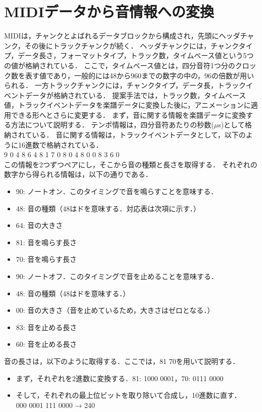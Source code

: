 \section{MIDIデータから音情報への変換} \label{sec:analysis}
MIDIは，チャンクとよばれるデータブロックから構成され，先頭にヘッダチャンク，その後にトラックチャンクが続く．
ヘッダチャンクには，チャンクタイプ，データ長さ，フォーマットタイプ，トラック数，タイムベース値という5つの値が格納されている．
ここで，タイムベース値とは，四分音符1つ分のクロック数を表す値であり，一般的には48から960までの数字の中の，96の倍数が用いられる．
一方トラックチャンクには，チャンクタイプ，データ長，トラックイベントデータが格納されている．
提案手法では，トラック数，タイムベース値，トラックイベントデータを楽譜データに変換した後に，アニメーションに適用できる形へとさらに変更する．
\indent
まず，音に関する情報を楽譜データに変換する方法について説明する．
テンポ情報は，四分音符あたりの秒数($\mu$s)として格納されている．
音に関する情報は，トラックイベントデータとして，以下のように16進数で格納されている．\\

\hspace{10mm}9 0 4 8 6 4 8 1 7 0 8 0 4 8 0 0 8 3 6 0\\

この情報を2つずつペアにし，そこから音の種類と長さを取得する．
それぞれの数字から得られる情報は，以下の通りである．
\begin{itemize}
	\item 90: ノートオン．このタイミングで音を鳴らすことを意味する．
	\item 48: 音の種類（48はドを意味する．対応表は次項に示す．）
	\item 64: 音の大きさ
	\item 81: 音を鳴らす長さ
	\item 70: 音を鳴らす長さ
	\item 90: ノートオフ．このタイミングで音を止めることを意味する．
	\item 48: 音の種類（48はドを意味する．）
	\item 00: 音の大きさ（音を止めているため，大きさはゼロとなる．）
	\item 83: 音を止める長さ
	\item 60: 音を止める長さ
\end{itemize}

音の長さは，以下のように取得する．ここでは，81 70を用いて説明する．
\begin{itemize}
	\item まず，それぞれを2進数に変換する．\hspace{1mm}81: 1000 0001，70: 0111 0000
	\item そして，それぞれの最上位ビットを取り除いて合成し，10進数に直す．\\
	\hspace{1mm}000 0001 111 0000 → 240
\end{itemize}

